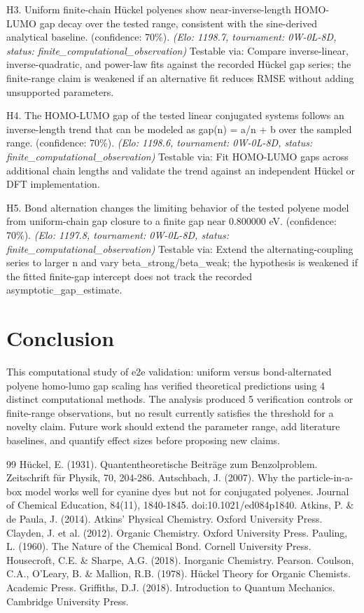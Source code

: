 \documentclass[11pt,a4paper]{article}
\begin{document}
H3. Uniform finite-chain Hückel polyenes show near-inverse-length HOMO-LUMO gap decay over the tested range, consistent with the sine-derived analytical baseline. (confidence: 70\%). \textit{(Elo: 1198.7, tournament: 0W-0L-8D, status: finite\_computational\_observation)} Testable via: Compare inverse-linear, inverse-quadratic, and power-law fits against the recorded Hückel gap series; the finite-range claim is weakened if an alternative fit reduces RMSE without adding unsupported parameters.

H4. The HOMO-LUMO gap of the tested linear conjugated systems follows an inverse-length trend that can be modeled as gap(n) = a/n + b over the sampled range. (confidence: 70\%). \textit{(Elo: 1198.6, tournament: 0W-0L-8D, status: finite\_computational\_observation)} Testable via: Fit HOMO-LUMO gaps across additional chain lengths and validate the trend against an independent Hückel or DFT implementation.

H5. Bond alternation changes the limiting behavior of the tested polyene model from uniform-chain gap closure to a finite gap near 0.800000 eV. (confidence: 70\%). \textit{(Elo: 1197.8, tournament: 0W-0L-8D, status: finite\_computational\_observation)} Testable via: Extend the alternating-coupling series to larger n and vary beta\_strong/beta\_weak; the hypothesis is weakened if the fitted finite-gap intercept does not track the recorded asymptotic\_gap\_estimate.


\section{Conclusion}
This computational study of e2e validation: uniform versus bond-alternated polyene homo-lumo gap scaling has verified theoretical predictions using 4 distinct computational methods. The analysis produced 5 verification controls or finite-range observations, but no result currently satisfies the threshold for a novelty claim. Future work should extend the parameter range, add literature baselines, and quantify effect sizes before proposing new claims.


\begin{thebibliography}{99}
 Hückel, E. (1931). Quantentheoretische Beiträge zum Benzolproblem. Zeitschrift für Physik, 70, 204-286.
 Autschbach, J. (2007). Why the particle-in-a-box model works well for cyanine dyes but not for conjugated polyenes. Journal of Chemical Education, 84(11), 1840-1845. doi:10.1021/ed084p1840.
 Atkins, P. \& de Paula, J. (2014). Atkins' Physical Chemistry. Oxford University Press.
 Clayden, J. et al. (2012). Organic Chemistry. Oxford University Press.
 Pauling, L. (1960). The Nature of the Chemical Bond. Cornell University Press.
 Housecroft, C.E. \& Sharpe, A.G. (2018). Inorganic Chemistry. Pearson.
 Coulson, C.A., O'Leary, B. \& Mallion, R.B. (1978). Hückel Theory for Organic Chemists. Academic Press.
 Griffiths, D.J. (2018). Introduction to Quantum Mechanics. Cambridge University Press.
\end{thebibliography}
\end{document}
